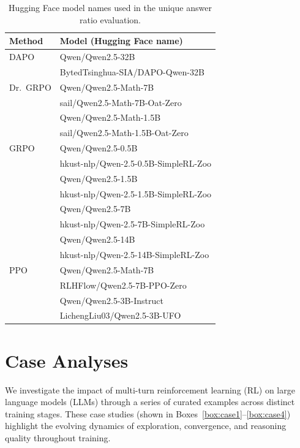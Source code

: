 \begin{table}[t]
\centering
\caption{Hugging Face model names used in the unique answer ratio evaluation.}
\begin{tabular}{ll}
\toprule
\textbf{Method} & \textbf{Model (Hugging Face name)} \\
\midrule
DAPO & Qwen/Qwen2.5-32B \\
     & BytedTsinghua-SIA/DAPO-Qwen-32B \\
\midrule
Dr.\ GRPO & Qwen/Qwen2.5-Math-7B \\
          & sail/Qwen2.5-Math-7B-Oat-Zero \\
          & Qwen/Qwen2.5-Math-1.5B \\
          & sail/Qwen2.5-Math-1.5B-Oat-Zero \\
\midrule
GRPO & Qwen/Qwen2.5-0.5B \\
     & hkust-nlp/Qwen-2.5-0.5B-SimpleRL-Zoo\\
     & Qwen/Qwen2.5-1.5B \\
     & hkust-nlp/Qwen-2.5-1.5B-SimpleRL-Zoo \\
     & Qwen/Qwen2.5-7B \\
     & hkust-nlp/Qwen-2.5-7B-SimpleRL-Zoo \\
     & Qwen/Qwen2.5-14B \\
     & hkust-nlp/Qwen-2.5-14B-SimpleRL-Zoo \\
\midrule
PPO & Qwen/Qwen2.5-Math-7B \\
    & RLHFlow/Qwen2.5-7B-PPO-Zero \\
    & Qwen/Qwen2.5-3B-Instruct \\
    & LichengLiu03/Qwen2.5-3B-UFO \\
    
\bottomrule
\end{tabular}
\label{tab:hf-model-names}
\end{table}


\section{Case Analyses}

We investigate the impact of multi-turn reinforcement learning (RL) on large language models (LLMs) through a series of curated examples across distinct training stages. These case studies (shown in Boxes~\ref{box:case1}--\ref{box:case4}) highlight the evolving dynamics of exploration, convergence, and reasoning quality throughout training.


